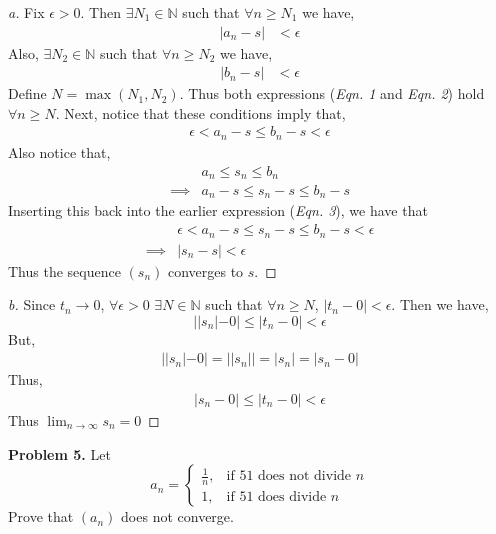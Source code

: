 \documentclass[leqno]{article}
\theoremstyle{nonumberplain}
\newtheorem{proof}{Proof}
\begin{document}
\begin{proof}[a]
Fix $\epsilon >0$.  Then $\exists N_1 \in \mathbb{N}$ such that $\forall n \geq N_1$ we have,
\begin{align}
|a_n - s|&< \epsilon
\end{align}
Also, $\exists N_2 \in \mathbb{N}$ such that $\forall n \geq N_2$ we have,
\begin{align}
|b_n -s|&<\epsilon
\end{align}
Define $N = \max(N_1,N_2)$.  Thus both expressions (\emph{Eqn. 1} and \emph{Eqn. 2}) hold $\forall n \geq N$. Next, notice that these conditions imply that,
\begin{align}
\epsilon < a_n -s \leq b_n -s < \epsilon
\end{align}
Also notice that,
\begin{align*}
&a_n \leq s_n \leq b_n \\
\implies &a_n-s \leq s_n -s \leq b_n -s
\end{align*}
Inserting this back into the earlier expression (\emph{Eqn. 3}), we have that
\begin{align*}
&\epsilon < a_n -s \leq s_n -s \leq b_n -s < \epsilon\\
\implies &|s_n-s|<\epsilon
\end{align*}
Thus the sequence $(s_n)$ converges to $s$.
\end{proof}

\begin{proof}[b]
Since $t_n \to 0$, $\forall \epsilon > 0$ $\exists N \in \mathbb{N}$ such that $\forall n \geq N$, $|t_n - 0| < \epsilon $.  Then we have,
\[
||s_n|-0| \leq |t_n-0| < \epsilon
\]
But,
\begin{align*}
||s_n|-0|=||s_n||=|s_n|=|s_n-0|
\end{align*}
Thus,
\begin{align*}
|s_n-0|\leq |t_n-0| < \epsilon
\end{align*}
Thus $\lim_{n \to \infty} s_n = 0$
\end{proof}

\pagebreak




\noindent\textbf{Problem 5.} Let
\[
a_n = 
\begin{cases}
\frac{1}{n}, & \text{if } 51 \text{ does not divide } n\\
1, & \text{if } 51 \text{ does divide } n
\end{cases}
\]
Prove that $(a_n)$ does not converge.
\end{document}
